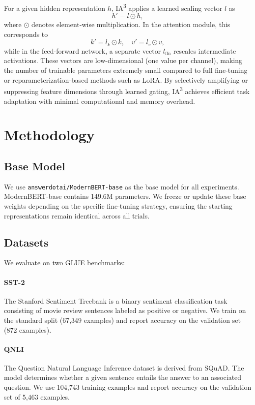 \documentclass[11pt]{article}
\begin{document}
For a given hidden representation $h$, IA\textsuperscript{3} applies a learned scaling vector $l$ as
\[
h' = l \odot h,
\]
where $\odot$ denotes element-wise multiplication. In the attention module, this corresponds to
\[
k' = l_k \odot k, \quad v' = l_v \odot v,
\]
while in the feed-forward network, a separate vector $l_{\text{ffn}}$ rescales intermediate activations. These vectors are low-dimensional (one value per channel), making the number of trainable parameters extremely small compared to full fine-tuning or reparameterization-based methods such as LoRA. By selectively amplifying or suppressing feature dimensions through learned gating, IA\textsuperscript{3} achieves efficient task adaptation with minimal computational and memory overhead.

\section{Methodology}

\subsection{Base Model}

We use \texttt{answerdotai/ModernBERT-base} as the base model for all experiments. ModernBERT-base contains 149.6M
parameters. We freeze or update these base weights depending on the specific fine-tuning strategy, ensuring the starting representations remain identical across all trials.

\subsection{Datasets}

We evaluate on two GLUE \cite{wang2019glue} benchmarks:

\paragraph{SST-2} The Stanford Sentiment Treebank \cite{socher2013sst2}
is a binary sentiment classification task consisting of movie review
sentences labeled as positive or negative. We train on the standard split
(67,349 examples) and report accuracy on the validation set (872 examples).

\paragraph{QNLI} The Question Natural Language Inference dataset is derived from SQuAD. The model determines whether a given sentence entails the answer to an associated question. We use 104,743 training examples and report accuracy on the validation set of 5,463 examples.
\end{document}
